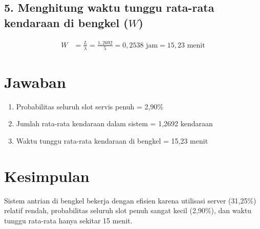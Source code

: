\documentclass{article}
\begin{document}
\subsection*{5. Menghitung waktu tunggu rata-rata kendaraan di bengkel ($W$)}
\begin{align}
W &= \frac{L}{\lambda} = \frac{1,2692}{5} = 0,2538 \text{ jam} = 15,23 \text{ menit}
\end{align}
\section*{Jawaban}
\begin{enumerate}
\item Probabilitas seluruh slot servis penuh = 2,90\%
\item Jumlah rata-rata kendaraan dalam sistem = 1,2692 kendaraan
\item Waktu tunggu rata-rata kendaraan di bengkel = 15,23 menit
\end{enumerate}
\section*{Kesimpulan}
Sistem antrian di bengkel bekerja dengan efisien karena utilisasi server (31,25\%) relatif rendah, probabilitas seluruh slot penuh sangat kecil (2,90\%), dan waktu tunggu rata-rata hanya sekitar 15 menit.
\end{document}
